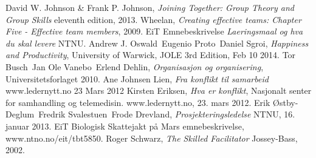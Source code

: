 \begin{thebibliography}{99}	%
		David W. Johnson \& Frank P. Johnson,
		\emph{Joining Together: Group Theory and Group Skills}
		eleventh edition,
		2013.
		Wheelan,
		\emph{Creating effective teams: Chapter Five - Effective team members},
		2009.
		EiT Emnebeskrivelse
		\emph{Laeringsmaal og hva du skal levere}
		NTNU.
		Andrew J. Oswald\, Eugenio Proto\, Daniel Sgroi,
		\emph{Happiness and Productivity},
		University of Warwick,
		JOLE 3rd Edition, Feb 10 2014.
		Tor Busch\, Jan Ole Vanebo\, Erlend Dehlin,
		\emph{Organisasjon og organisering},
		Universitetsforlaget 2010.
		Ane Johnsen Lien,
		\emph{Fra konflikt til samarbeid}
		www.ledernytt.no
		23 Mars 2012
		Kirsten Eriksen,
		\emph{Hva er konflikt},
		Nasjonalt senter for samhandling og telemedisin. 
		www.ledernytt.no,
		23. mars 2012.
		Erik Østby-Deglum\, Fredrik Svalestuen\, Frode Drevland,
		\emph{Prosjekteringsledelse}
		NTNU,
		16. januar 2013.
		EiT Biologisk Skattejakt på Mars emnebeskrivelse,
		www.ntno.no/eit/tbt5850.
		Roger Schwarz,
		\emph{The Skilled Facilitator}
		Jossey-Bass,
		2002.
		

\end{thebibliography}